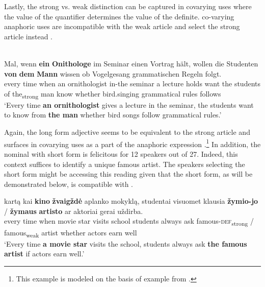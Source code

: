 \documentclass[output=paper,
modfonts
]{langscibook}
\begin{document}
Lastly, the strong vs. weak distinction can be captured in covarying uses where the value of the quantifier determines the value of the definite.  co-vary\-ing anaphoric uses are incompatible with the weak article and select the strong article instead . 

\begin{exe}
	\ex \label{ex:sereikaite:43}
	 \citep[33]{Schwarz2009} \\
	 {Mal}, {wenn} {\textbf{ein}} {\textbf{Onithologe}} {im} {Seminar} {einen} {Vortrag} {h\"alt}, {wollen} {die} {Studenten} \textbf{von} \textbf{dem} {\textbf{Mann}} {wissen} {ob} {Vogelgesang} {grammatischen} {Regeln} {folgt}. \\
	every time when {an} {ornithologist} in-the seminar a lecture holds want the students {of} {the\textsubscript{strong}} {man} know whether bird.singing grammatical rules follows\\
	\trans `Every time \textbf{an ornithologist} gives a lecture in the seminar, the students want to know from \textbf{the man} whether bird songs follow grammatical rules.' 
\end{exe}

Again, the long form adjective seems to be equivalent to the  strong article and surfaces in covarying uses as a part of the anaphoric expression .\footnote{This example is modeled on the basis of  example from .} In addition, the nominal with short form is felicitous for 12 speakers out of 27. Indeed, this context suffices to identify a unique famous artist. The speakers selecting the short form might be accessing this reading given that the short form, as will be demonstrated below, is compatible with .


\begin{exe}
	\ex \label{ex:sereikaite:44}
	 {kartą} {kai} \textbf{{kino}} \textbf{{žvaigždė}} {aplanko} {mokyklą}, {studentai} {visuomet} {klausia} \textbf{žymio-jo} \textnormal{/} \textbf{žymaus} \textbf{{artisto}} {ar} {aktoriai} {gerai} {uždirba}. \\
	every time when {movie} {star} visits school students always ask {famous-\textsc{def}\textsubscript{strong}} / {famous}\textsubscript{weak} {artist} whether actors earn well\\
	\trans `Every time \textbf{a movie star} visits the school, students always ask \textbf{the famous artist} if actors earn well.' 
\end{exe}
\end{document}
